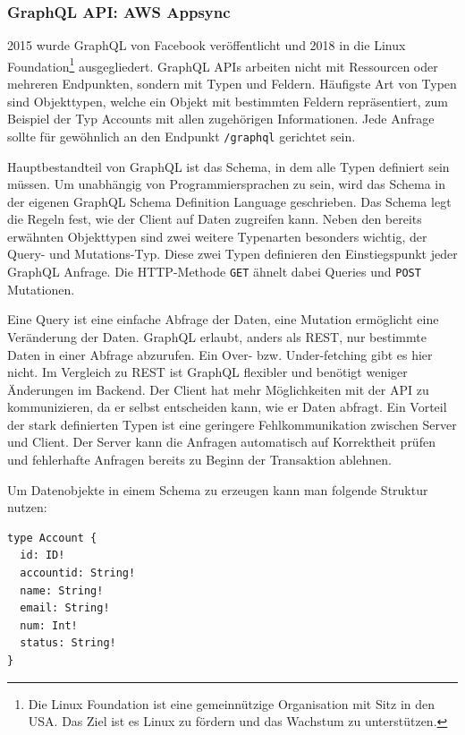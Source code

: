 \subsubsection{GraphQL API: AWS Appsync}
\label{GraphQL}
2015 wurde GraphQL von Facebook veröffentlicht und 2018 in die Linux Foundation\footnote{Die Linux Foundation ist eine gemeinnützige Organisation mit Sitz in den USA.
Das Ziel ist es Linux zu fördern und das Wachstum zu unterstützen.} ausgegliedert.
GraphQL APIs arbeiten nicht mit Ressourcen oder mehreren Endpunkten, sondern mit Typen und Feldern.
Häufigste Art von Typen sind Objekttypen, welche ein Objekt mit bestimmten Feldern repräsentiert, zum Beispiel der Typ Accounts mit allen zugehörigen Informationen.
Jede Anfrage sollte für gewöhnlich an den Endpunkt \verb+/graphql+ gerichtet sein.

Hauptbestandteil von GraphQL ist das Schema, in dem alle Typen definiert sein müssen.
Um unabhängig von Programmiersprachen zu sein, wird das Schema in der eigenen GraphQL Schema Definition Language geschrieben.
Das Schema legt die Regeln fest, wie der Client auf Daten zugreifen kann.
Neben den bereits erwähnten Objekttypen sind zwei weitere Typenarten besonders wichtig, der Query- und Mutations-Typ.
Diese zwei Typen definieren den Einstiegspunkt jeder GraphQL Anfrage.
Die HTTP-Methode \verb+GET+ ähnelt dabei Queries und \verb+POST+ Mutationen. \cite[]{GraphQL1}

Eine Query ist eine einfache Abfrage der Daten, eine Mutation ermöglicht eine Veränderung der Daten.
GraphQL erlaubt, anders als REST, nur bestimmte Daten in einer Abfrage abzurufen. Ein Over- bzw. Under-fetching gibt es hier nicht.
Im Vergleich zu REST ist GraphQL flexibler und benötigt weniger Änderungen im Backend.
Der Client hat mehr Möglichkeiten mit der API zu kommunizieren, da er selbst entscheiden kann, wie er Daten abfragt.
Ein Vorteil der stark definierten Typen ist eine geringere Fehlkommunikation zwischen Server und Client.
Der Server kann die Anfragen automatisch auf Korrektheit prüfen und fehlerhafte Anfragen bereits zu Beginn der Transaktion ablehnen.

Um Datenobjekte in einem Schema zu erzeugen kann man folgende Struktur nutzen:
\begin{lstlisting}[basicstyle=\ttfamily, breaklines=true , frame = single, backgroundcolor=\color{flashwhite} ]
type Account {
  id: ID!
  accountid: String!
  name: String!
  email: String!
  num: Int!
  status: String!
}
\end{lstlisting}

